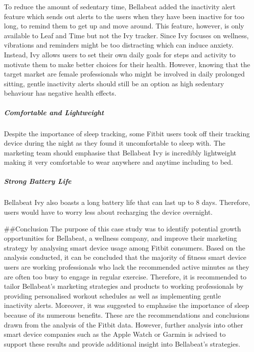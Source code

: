 \documentclass[
]{article}
\begin{document}
To reduce the amount of sedentary time, Bellabeat added the inactivity
alert feature which sends out alerts to the users when they have been
inactive for too long, to remind them to get up and move around. This
feature, however, is only available to Leaf and Time but not the Ivy
tracker. Since Ivy focuses on wellness, vibrations and reminders might
be too distracting which can induce anxiety. Instead, Ivy allows users
to set their own daily goals for steps and activity to motivate them to
make better choices for their health. However, knowing that the target
market are female professionals who might be involved in daily prolonged
sitting, gentle inactivity alerts should still be an option as high
sedentary behaviour has negative health effects.

\hypertarget{comfortable-and-lightweight}{%
\subparagraph{Comfortable and
Lightweight}\label{comfortable-and-lightweight}}

Despite the importance of sleep tracking, some Fitbit users took off
their tracking device during the night as they found it uncomfortable to
sleep with. The marketing team should emphasise that Bellabeat Ivy is
incredibly lightweight making it very comfortable to wear anywhere and
anytime including to bed.

\hypertarget{strong-battery-life}{%
\subparagraph{Strong Battery Life}\label{strong-battery-life}}

Bellabeat Ivy also boasts a long battery life that can last up to 8
days. Therefore, users would have to worry less about recharging the
device overnight.

\#\#Conclusion The purpose of this case study was to identify potential
growth opportunities for Bellabeat, a wellness company, and improve
their marketing strategy by analysing smart device usage among Fitbit
consumers. Based on the analysis conducted, it can be concluded that the
majority of fitness smart device users are working professionals who
lack the recommended active minutes as they are often too busy to engage
in regular exercise. Therefore, it is recommended to tailor Bellabeat's
marketing strategies and products to working professionals by providing
personalised workout schedules as well as implementing gentle inactivity
alerts. Moreover, it was suggested to emphasise the importance of sleep
because of its numerous benefits. These are the recommendations and
conclusions drawn from the analysis of the Fitbit data. However, further
analysis into other smart device companies such as the Apple Watch or
Garmin is advised to support these results and provide additional
insight into Bellabeat's strategies.
\end{document}
